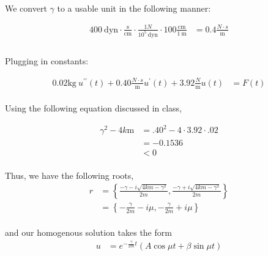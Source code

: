 \documentclass{article}
\begin{document}
\paragraph{}We convert $\gamma$ to a usable unit in the following manner:

\begin{align*}
    400 \mathrm{~dyn} \cdot \frac{\mathrm{s}}{\mathrm{cm}} \cdot \frac{1 N}{10^5\mathrm{~dyn}} \cdot 100 \frac{\mathrm{cm}}{1\mathrm{~m}}
    &= 0.4 \frac{N\cdot s}{\mathrm{m}}\\
\end{align*}

\paragraph{}Plugging in constants:

\begin{align*}
    0.02 \mathrm{kg~} u^{\prime\prime}(t) + 0.40  \frac{N\cdot s}{\mathrm{m}} u^{\prime}(t) +  3.92 \frac{N}{\mathrm{m}} u(t) &= F(t)
\end{align*}

\paragraph{}Using the following equation discussed in class, 

\begin{align*}
    \gamma^2 - 4 k \mathrm{m} &= .40^2 - 4\cdot 3.92 \cdot .02\\
                              &= -0.1536\\
                              &< 0 
\end{align*}

\paragraph{}Thus, we have the following roots,
\[
\begin{aligned}
    r &=\left\{\frac{-\gamma-i \sqrt{4 km -\gamma^2}}{2 m}, \frac{-\gamma+i \sqrt{4 km-\gamma^2}}{2 m}\right\} \\
&=\left\{-\frac{\gamma}{2 m}-i \mu,-\frac{\gamma}{2 m}+i \mu\right\}
\end{aligned}
\]

\paragraph{}and our homogenous solution takes the form
\begin{align*}
    u&=e^{-\frac{\gamma}{2m} t}(A \cos \mu t+\beta \sin \mu t) \\
\end{align*}
\end{document}
